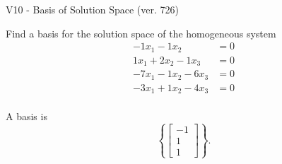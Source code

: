 \begin{exercise}
  \begin{exerciseTitle}V10 - Basis of Solution Space (ver. 726)\end{exerciseTitle}
  \begin{exerciseStatement}
    Find a basis for the solution space of the homogeneous system 
\begin{align*}
 -1 x_ 1 -1 x_ 2 &= 0  \\ 
  1 x_ 1 + 2 x_ 2 -1 x_ 3 &= 0  \\ 
  -7 x_ 1 -1 x_ 2 -6 x_ 3 &= 0  \\ 
  -3 x_ 1 + 1 x_ 2 -4 x_ 3 &= 0  \\ 
 \end{align*}


 
  \end{exerciseStatement}

  \begin{exerciseAnswer}
   A basis is   
\[\left\{\left[\begin{array}{c}
-1 \\
1 \\
1
\end{array}\right]\right\}.\]

  


  \end{exerciseAnswer}
\end{exercise}